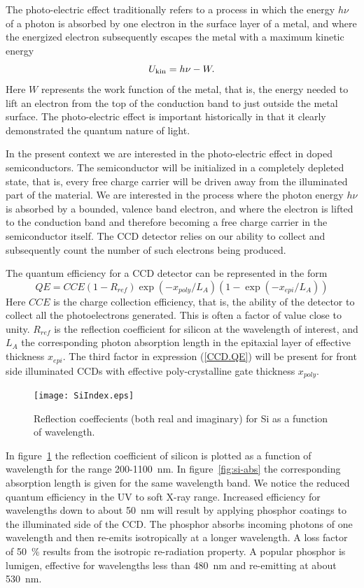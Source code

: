 The photo-electric effect traditionally refers to a process in which
the energy $h\nu$ of a photon is absorbed by one electron in the
surface layer of a metal, and where the energized electron
subsequently escapes the metal with a maximum kinetic energy
\begin{equation}
  U_{\rm kin} = h\nu - W.
\end{equation}
Here $W$ represents the work function of the metal, that is, the
energy needed to lift an electron from the top of the conduction band
to just outside the metal surface. The photo-electric effect is
important historically in that it clearly demonstrated the quantum
nature of light.

In the present context we are interested in the photo-electric effect
in doped semiconductors. The semiconductor will be initialized in a
completely depleted state, that is, every free charge carrier will be
driven away from the illuminated part of the material. We are
interested in the process where the photon energy $h\nu$ is absorbed
by a bounded, valence band electron, and where the electron is
lifted to the conduction band and therefore becoming a free charge
carrier in the semiconductor itself. The CCD detector relies on our 
ability to collect and subsequently count the number of such electrons
being produced.

The quantum efficiency for a CCD detector can be represented in the form
\begin{equation}
  QE = CCE(1-R_{ref}) \exp(-x_{poly}/L_A) (1-\exp(-x_{epi}/L_A))
  \label{CCD.QE}
\end{equation}
Here $CCE$ is the charge collection efficiency, that is, the ability
of the detector to collect all the photoelectrons generated. This is
often a factor of value close to unity. $R_{ref}$ is the reflection
coefficient for silicon at the wavelength of interest, and $L_A$ the
corresponding photon absorption length in the epitaxial layer of
effective thickness $x_{epi}$. The third factor in expression
(\ref{CCD.QE}) will be present for front side illuminated CCDs with
effective poly-crystalline gate thickness $x_{poly}$. 

\begin{figure}[h!]
	\centering
	\texttt{[image: SiIndex.eps]}
	\caption{Reflection coeffecients (both real and imaginary) for Si as a function
		of wavelength.}
	\label{fig:si-refl}
\end{figure}

In figure~\ref{fig:si-refl} the reflection 
coefficient of silicon is plotted as a function of wavelength for the range 
200-1100~nm. In figure~\ref{fig:si-abs} the
corresponding absorption length is given for the same wavelength band.
We notice the reduced quantum efficiency in the UV to soft X-ray
range. Increased efficiency for wavelengths down to about 50~nm will
result by applying phosphor coatings to the illuminated side of the
CCD. The phosphor absorbs incoming photons of one wavelength and then
re-emits isotropically at a longer wavelength. A loss factor of 50~\%
results from the isotropic re-radiation property. A popular phosphor
is lumigen, effective for wavelengths less than 480~nm and
re-emitting at about 530~nm. 


